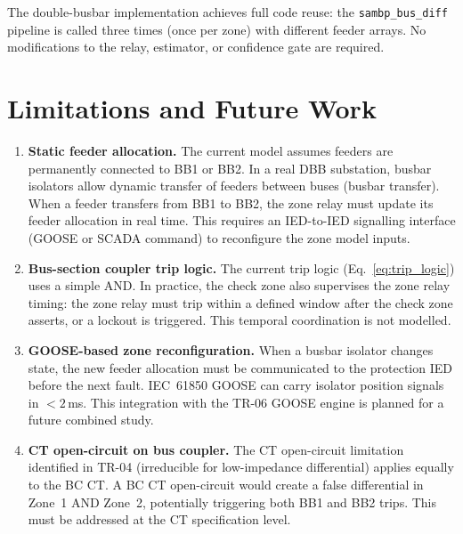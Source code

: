 \documentclass[12pt,a4paper]{article}
\begin{document}
The double-busbar implementation achieves full code reuse: the
\texttt{sambp\_bus\_diff} pipeline is called three times (once per
zone) with different feeder arrays.  No modifications to the relay,
estimator, or confidence gate are required.

\section{Limitations and Future Work}

\begin{enumerate}
  \item \textbf{Static feeder allocation.}
    The current model assumes feeders are permanently connected to BB1
    or BB2.  In a real DBB substation, busbar isolators allow dynamic
    transfer of feeders between buses (busbar transfer).  When a feeder
    transfers from BB1 to BB2, the zone relay must update its feeder
    allocation in real time.  This requires an IED-to-IED signalling
    interface (GOOSE or SCADA command) to reconfigure the zone model
    inputs.

  \item \textbf{Bus-section coupler trip logic.}
    The current trip logic (Eq.~\ref{eq:trip_logic}) uses a simple AND.
    In practice, the check zone also supervises the zone relay timing:
    the zone relay must trip within a defined window after the check zone
    asserts, or a lockout is triggered.  This temporal coordination is
    not modelled.

  \item \textbf{GOOSE-based zone reconfiguration.}
    When a busbar isolator changes state, the new feeder allocation must
    be communicated to the protection IED before the next fault.
    IEC~61850 GOOSE can carry isolator position signals in $<2$\,ms.
    This integration with the TR-06 GOOSE engine is planned for a future
    combined study.

  \item \textbf{CT open-circuit on bus coupler.}
    The CT open-circuit limitation identified in TR-04 (irreducible for
    low-impedance differential) applies equally to the BC CT.  A BC CT
    open-circuit would create a false differential in Zone~1 AND
    Zone~2, potentially triggering both BB1 and BB2 trips.  This must
    be addressed at the CT specification level.
\end{enumerate}
\end{document}
